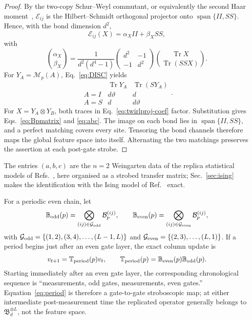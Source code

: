 \documentclass[aps,prx,reprint,superscriptaddress,nobibnotes,longbibliography]{revtex4-2}
\theoremstyle{remark}
\newcommand{\Tr}{\operatorname{Tr}}
\newcommand{\vth}{\vartheta}
\newcommand{\Tper}{\mathbb T_{\rm period}}
\begin{document}
\begin{proof}
By the two-copy Schur--Weyl commutant, or equivalently the second Haar moment~\cite{Collins2003}, $\mathcal E_{ij}$ is the Hilbert--Schmidt orthogonal projector onto $\operatorname{span}\{II,SS\}$.  Hence, with the bond dimension $d^2$,
\begin{equation}
 \mathcal E_{ij}(X)=\alpha_XII+\beta_XSS,
 \label{eq:twirlproj}
\end{equation}
with
\begin{equation}
 \binom{\alpha_X}{\beta_X}=
 \frac1{d^2(d^4-1)}\begin{pmatrix}d^2&-1\\-1&d^2\end{pmatrix}
 \binom{\Tr X}{\Tr(SSX)}.
 \label{eq:twirlproj-coef}
\end{equation}
For $Y_A=\mathcal M_p(A)$, Eq.~\eqref{eq:DISC} yields
\begin{equation}
\begin{array}{c|cc}
 &\Tr Y_A&\Tr(SY_A)\\ \hline
 A=I&d\vth&d\\ A=S&d&d\vth
\end{array}.
\label{eq:localtraces}
\end{equation}
For $X=Y_A\otimes Y_B$, both traces in Eq.~\eqref{eq:twirlproj-coef} factor.  Substitution gives Eqs.~\eqref{eq:Bpmatrix} and \eqref{eq:abc}.  The image on each bond lies in $\operatorname{span}\{II,SS\}$, and a perfect matching covers every site.  Tensoring the bond channels therefore maps the global feature space into itself.  Alternating the two matchings preserves the assertion at each post-gate strobe.
\end{proof}

The entries $(a,b,c)$ are the $n=2$ Weingarten data of the replica statistical models of Refs.~\cite{Jian2020,Bao2020}, here organised as a strobed transfer matrix; Sec.~\ref{sec:ising} makes the identification with the Ising model of Ref.~\cite{Bao2020} exact.

For a periodic even chain, let
\begin{equation}
 \mathbb B_{\rm odd}(p)=\bigotimes_{(ij)\in\mathcal G_{\rm odd}}\mathcal B_p^{(ij)},\qquad
 \mathbb B_{\rm even}(p)=\bigotimes_{(ij)\in\mathcal G_{\rm even}}\mathcal B_p^{(ij)},
\end{equation}
with $\mathcal G_{\rm odd}=\{(1,2),(3,4),\ldots,(L-1,L)\}$ and $\mathcal G_{\rm even}=\{(2,3),\ldots,(L,1)\}$.
If a period begins just after an even gate layer, the exact column update is
\begin{equation}
 v_{t+1}=\Tper(p)v_t,\qquad
 \Tper(p)=\mathbb B_{\rm even}(p)\mathbb B_{\rm odd}(p).
 \label{eq:period}
\end{equation}
Starting immediately after an even gate layer, the corresponding chronological sequence is ``measurements, odd gates, measurements, even gates.''  Equation~\eqref{eq:period} is therefore a gate-to-gate stroboscopic map; at either intermediate post-measurement time the replicated operator generally belongs to $\mathfrak B_d^{\otimes L}$, not the feature space.
\end{document}
